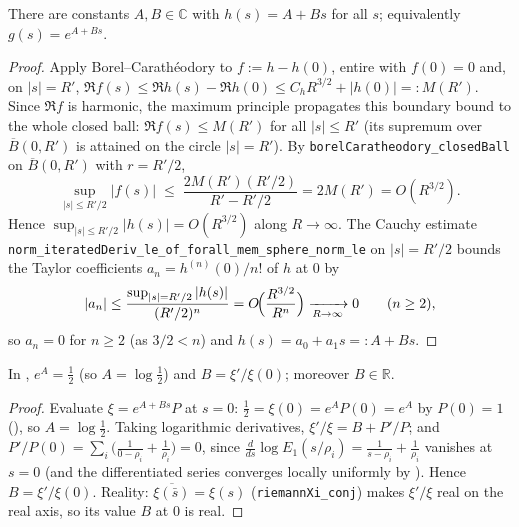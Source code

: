 \begin{lemma}
\label{lem:hf_h_linear}
\leanok
{}
There are constants $A,B\in\mathbb C$ with $h(s)=A+Bs$ for all $s$; equivalently
$g(s)=e^{A+Bs}$.
\end{lemma}

\begin{proof}
\leanok
{}
Apply Borel--Carathéodory to $f:=h-h(0)$, entire with $f(0)=0$ and, on $|s|=R'$,
$\Re f(s)\le\Re h(s)-\Re h(0)\le C_hR^{3/2}+|h(0)|=:M(R')$. Since $\Re f$ is
harmonic, the maximum principle propagates this boundary bound to the whole closed
ball: $\Re f(s)\le M(R')$ for all $|s|\le R'$ (its supremum over $\overline B(0,R')$
is attained on the circle $|s|=R'$). By
\texttt{borelCaratheodory\_closedBall} on $\overline{B}(0,R')$ with $r=R'/2$,
\[
  \sup_{|s|\le R'/2}|f(s)|\;\le\;\frac{2M(R')(R'/2)}{R'-R'/2}=2M(R')=O(R^{3/2}).
\]
Hence $\sup_{|s|\le R'/2}|h(s)|=O(R^{3/2})$ along $R\to\infty$. The Cauchy estimate
\texttt{norm\_iteratedDeriv\_le\_of\_forall\_mem\_sphere\_norm\_le} on $|s|=R'/2$
bounds the Taylor coefficients $a_n=h^{(n)}(0)/n!$ of $h$ at $0$ by
\[
  |a_n|\le\frac{\sup_{|s|=R'/2}|h(s)|}{(R'/2)^{n}}=O\!\Bigl(\frac{R^{3/2}}{R^{n}}\Bigr)
   \xrightarrow[R\to\infty]{}0\qquad(n\ge2),
\]
so $a_n=0$ for $n\ge2$ (as $3/2<n$) and $h(s)=a_0+a_1s=:A+Bs$.
\end{proof}

\begin{lemma}
\label{lem:hf_constants}
\leanok
{}
In , $e^{A}=\tfrac12$ (so $A=\log\tfrac12$) and
$B=\xi'/\xi(0)$; moreover $B\in\mathbb R$.
\end{lemma}

\begin{proof}
\leanok
{}
Evaluate $\xi=e^{A+Bs}P$ at $s=0$: $\tfrac12=\xi(0)=e^{A}P(0)=e^{A}$ by $P(0)=1$
(), so $A=\log\tfrac12$. Taking logarithmic derivatives,
$\xi'/\xi=B+P'/P$; and $P'/P(0)=\sum_i\bigl(\tfrac{1}{0-\rho_i}+\tfrac1{\rho_i}\bigr)=0$,
since $\tfrac{d}{ds}\log E_1(s/\rho_i)=\tfrac{1}{s-\rho_i}+\tfrac1{\rho_i}$ vanishes at
$s=0$ (and the differentiated series converges locally uniformly by
). Hence $B=\xi'/\xi(0)$. Reality:
$\overline{\xi(\bar s)}=\xi(s)$ (\texttt{riemannXi\_conj}) makes $\xi'/\xi$ real on
the real axis, so its value $B$ at $0$ is real.
\end{proof}

